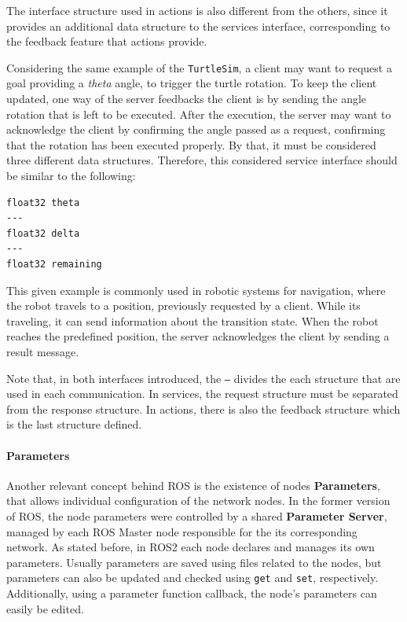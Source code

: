 The interface structure used in actions is also different from the others, since it provides an additional data structure to the services interface, corresponding to the feedback feature that actions provide.
                
Considering the same example of the \texttt{TurtleSim}, a client may want to request a goal providing a \textit{theta} angle, to trigger the turtle rotation. To keep the client updated, one way of the server feedbacks the client is by sending the angle rotation that is left to be executed. After the execution, the server may want to acknowledge the client by confirming the angle passed as a request, confirming that the rotation has been executed properly. By that, it must be considered three different data structures. Therefore, this considered service interface should be similar to the following:

\begin{verbatim}
float32 theta
---
float32 delta
---
float32 remaining
\end{verbatim}

This given example is commonly used in robotic systems for navigation, where the robot travels to a position, previously requested by a client. While its traveling, it can send information about the transition state. When the robot reaches the predefined position, the server acknowledges the client by sending a result message. 

Note that, in both interfaces introduced, the \texttt{---} divides the each structure that are used in each communication. In services, the request structure must be separated from the response structure. In actions, there is also the feedback structure which is the last structure defined.  
               
\paragraph{Parameters}
               
Another relevant concept behind ROS is the existence of nodes \textbf{Parameters}, that allows individual configuration of the network nodes. In the former version of ROS, the node parameters were controlled by a shared \textbf{Parameter Server}, managed by each ROS Master node responsible for the its corresponding network. As stated before, in ROS2 each node declares and manages its own parameters. Usually parameters are saved using files related to the nodes, but parameters can also be updated and checked using \texttt{get} and \texttt{set}, respectively. Additionally, using a parameter function callback, the node's parameters can easily be edited.
               
